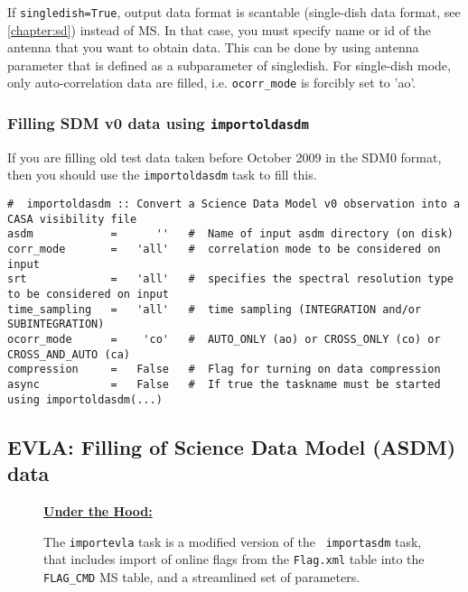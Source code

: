 If {\tt singledish=True}, output data format is scantable (single-dish data
format, see \ref{chapter:sd}) instead of MS. In that case, you must specify
name or id of the antenna that you want to obtain data. This can be
done by using antenna parameter that is defined as a subparameter of
singledish. For single-dish mode, only auto-correlation data are
filled, i.e. {\tt ocorr\_mode} is forcibly set to 'ao'. 

\subsubsection{Filling SDM v0 data using {\tt importoldasdm}}
\label{section:io.import.asdm.old}

If you are filling old test data taken
before October 2009 in the SDM0 format, then you should use the 
{\tt importoldasdm} task to fill this.
\small
\begin{verbatim}
#  importoldasdm :: Convert a Science Data Model v0 observation into a CASA visibility file
asdm            =      ''   #  Name of input asdm directory (on disk)
corr_mode       =   'all'   #  correlation mode to be considered on input
srt             =   'all'   #  specifies the spectral resolution type to be considered on input
time_sampling   =   'all'   #  time sampling (INTEGRATION and/or SUBINTEGRATION)
ocorr_mode      =    'co'   #  AUTO_ONLY (ao) or CROSS_ONLY (co) or CROSS_AND_AUTO (ca)
compression     =   False   #  Flag for turning on data compression
async           =   False   #  If true the taskname must be started using importoldasdm(...)
\end{verbatim}
\normalsize

\subsection{EVLA: Filling of Science Data Model (ASDM) data}
\label{section:io.import.evla}

\begin{wrapfigure}{r}{2.5in}
  \begin{boxedminipage}{2.5in}
     \centerline{\underline{\bf Under the Hood:}}
     The {\tt importevla} task is a modified version of the {\tt
     importasdm} task, that includes import of online flags from 
     the {\tt Flag.xml} table into the {\tt FLAG\_CMD} MS table,
     and a streamlined set of parameters.
  \end{boxedminipage}
\end{wrapfigure}

